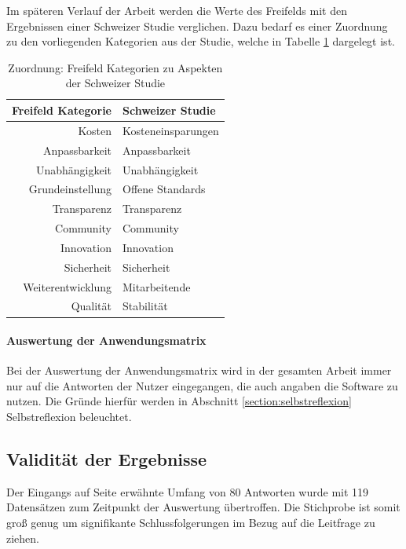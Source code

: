 \documentclass[a4paper]{article}
\begin{document}
            Im späteren Verlauf der Arbeit werden die Werte des Freifelds mit den Ergebnissen einer Schweizer Studie verglichen. Dazu bedarf es einer Zuordnung zu den vorliegenden Kategorien aus der Studie, welche in Tabelle \ref{table:privateToCommercialCategories} dargelegt ist.\\
            
            \begin{table}
                \centering
                \bgroup
                \def\arraystretch{1.5}
                \begin{tabular}{ r | l }
                    Freifeld Kategorie & Schweizer Studie\\ \hline
                    Kosten & Kosteneinsparungen\\
                    Anpassbarkeit & Anpassbarkeit\\
                    Unabhängigkeit & Unabhängigkeit\\
                    Grundeinstellung & Offene Standards\\
                    Transparenz & Transparenz\\
                    Community & Community\\
                    Innovation & Innovation\\
                    Sicherheit & Sicherheit\\
                    Weiterentwicklung & Mitarbeitende\\
                    Qualität & Stabilität
                \end{tabular}
                \egroup
                \caption{Zuordnung: Freifeld Kategorien zu Aspekten der Schweizer Studie}
                \label{table:privateToCommercialCategories}
            \end{table}
            
            \paragraph{Auswertung der Anwendungsmatrix}
                Bei der Auswertung der Anwendungsmatrix wird in der gesamten Arbeit immer nur auf die Antworten der Nutzer eingegangen, die auch angaben die Software zu nutzen. Die Gründe hierfür werden in Abschnitt \ref{section:selbstreflexion} Selbstreflexion beleuchtet.
            
        \subsection{Validität der Ergebnisse}
            Der Eingangs auf Seite \pageref{section:fragestellung:answerAmount} erwähnte Umfang von 80 Antworten wurde mit 119 Datensätzen zum Zeitpunkt der Auswertung übertroffen. Die Stichprobe ist somit groß genug um signifikante Schlussfolgerungen im Bezug auf die Leitfrage zu ziehen. %
\end{document}
